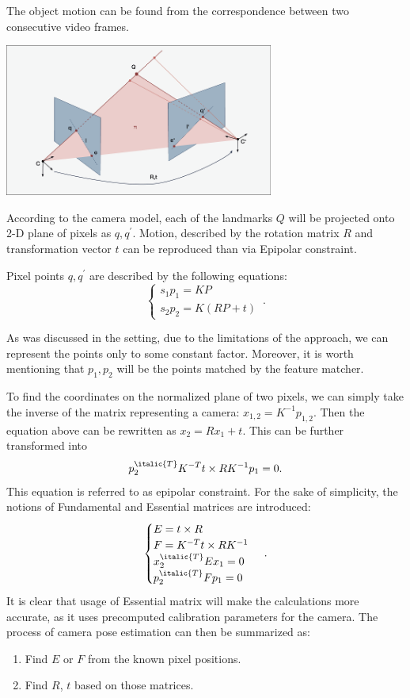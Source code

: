 The object motion can be found from the correspondence between two consecutive video frames. 
\begin{center}
    \includegraphics[height=5cm]{nc.png}\\[1cm]
\end{center}

According to the camera model, each of the landmarks $Q$ will be projected onto 2-D plane of pixels as $q, q^{\prime}$. Motion, described by the rotation matrix $R$ and transformation vector $t$ can be reproduced than via Epipolar constraint. 

Pixel points $q, q^{\prime}$ are described by the following equations:
\begin{equation}
    \begin{cases}
      s_{1} p_{1} = K P\\
      s_{2} p_{2} = K(RP + t)
    \end{cases}\,.
\end{equation}

As was discussed in the setting, due to the limitations of the approach, we can represent the points only to some constant factor. Moreover, it is worth mentioning that $p_{1}, p_{2}$ will be the points matched by the feature matcher.

To find the coordinates on the normalized plane of two pixels, we can simply take the inverse of the matrix representing a camera:
$x_{1, 2} = K^{-1}p_{1, 2}.$ Then the equation above can be rewritten as $x_{2} = Rx_{1} + t.$ This can be further transformed into $$p_{2}^{\italic{T}} K^{-T} t \times R K^{-1} p_{1} = 0.$$ This equation is referred to as epipolar constraint. For the sake of simplicity, the notions of Fundamental and Essential matrices are introduced:
\begin{equation}
    \begin{cases}
      E = t \times R\\
      F = K^{-T} t \times R K^{-1}\\
      x_{2}^{\italic{T}} E x_{1} = 0\\
      p_{2}^{\italic{T}} F p_{1} = 0
    \end{cases}\,.
\end{equation}
It is clear that usage of Essential matrix will make the calculations more accurate, as it uses precomputed calibration parameters for the camera. 
The process of camera pose estimation can then be summarized as:
\begin{enumerate}
    \item Find $E$ or $F$ from the known pixel positions.
    \item Find $R$, $t$ based on those matrices.
\end{enumerate}

